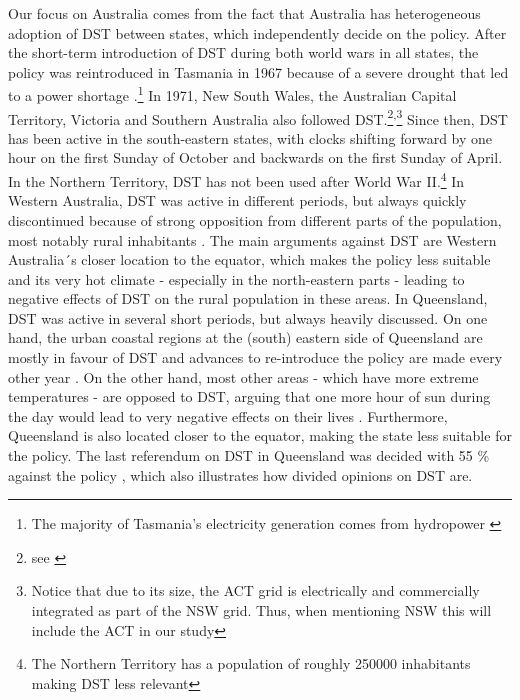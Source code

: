 Our focus on Australia comes from the fact that Australia has heterogeneous adoption of \ac{DST} between states, which independently decide on the policy. After the short-term introduction of DST during both world wars in all states, the policy was reintroduced in Tasmania in 1967 because of a severe drought that led to a power shortage \parencite{Tasmania}.\footnote{The majority of Tasmania's electricity generation comes from hydropower \parencite{aemc_tas}}
In 1971, New South Wales, the Australian Capital Territory, Victoria and Southern Australia also followed \ac{DST}.\footnote{see \cite{NewSouthWales, ACP, Victoria, SouthernAustralia}}\textsuperscript{,}\footnote{Notice that due to its size, the ACT grid is electrically and commercially integrated as part of the NSW grid. Thus, when mentioning NSW this will include the ACT in our study} Since then, \ac{DST} has been active in the south-eastern states, with clocks shifting forward by one hour on the first Sunday of October and backwards on the first Sunday of April. In the Northern Territory, \ac{DST} has not been used after World War II.\footnote{The Northern Territory has a population of roughly 250000 inhabitants \parencite{nt_pop} making \ac{DST} less relevant}
In Western Australia, \ac{DST} was active in different periods, but always quickly discontinued because of strong opposition from different parts of the population, most notably rural inhabitants \parencite{pearce_great_2017}. The main arguments against \ac{DST} are Western Australia´s closer location to the equator, which makes the policy less suitable and its very hot climate - especially in the north-eastern parts - leading to negative effects of \ac{DST} on the rural population in these areas.  
In Queensland, \ac{DST} was active in several short periods, but always heavily discussed. On one hand, the urban coastal regions at the (south) eastern side of Queensland are mostly in favour of \ac{DST} and advances to re-introduce the policy are made every other year \parencite{pearce_history_2017}. On the other hand, most other areas - which have more extreme temperatures -  are opposed to \ac{DST}, arguing that one more hour of sun during the day would lead to very negative effects on their lives \parencite{westcott_daylight_2010}. Furthermore, Queensland is also located closer to the equator, making the state less suitable for the policy. The last referendum on \ac{DST} in Queensland was decided with 55 \% against the policy \parencite{queensland_referendum}, which also illustrates how divided opinions on \ac{DST} are.  
\newline
